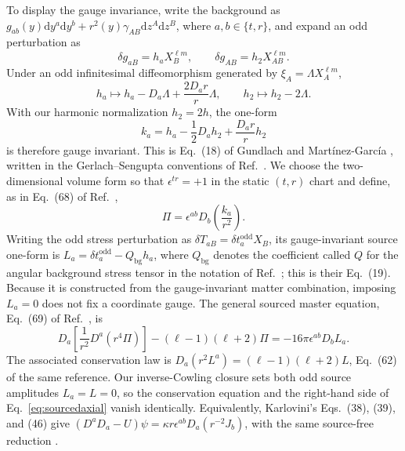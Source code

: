 \documentclass[12pt,a4paper]{article}
\newcommand{\dd}{\mathrm{d}}
\begin{document}
To display the gauge invariance, write the background as
\(g_{ab}(y)\dd y^a\dd y^b+r^2(y)\gamma_{AB}\dd z^A\dd z^B\), where
\(a,b\in\{t,r\}\), and expand an odd perturbation as
\begin{equation}
\delta g_{aB}=h_a X_B^{\ell m},
\qquad
\delta g_{AB}=h_2 X_{AB}^{\ell m}.
\label{eq:odddecomposition}
\end{equation}
Under an odd infinitesimal diffeomorphism generated by
\(\xi_A=\Lambda X_A^{\ell m}\),
\begin{equation}
h_a\mapsto h_a-D_a\Lambda+\frac{2D_a r}{r}\Lambda,
\qquad
h_2\mapsto h_2-2\Lambda.
\label{eq:oddgaugetransformation}
\end{equation}
With our harmonic normalization \(h_2=2h\), the one-form
\begin{equation}
k_a=h_a-\frac12 D_a h_2+\frac{D_a r}{r}h_2
\label{eq:oddgaugeinvariant}
\end{equation}
is therefore gauge invariant.  This is Eq.~(18) of
Gundlach and Mart\'inez-Garc\'ia \cite{Gundlach1999}, written in the
Gerlach--Sengupta conventions of Ref.~\cite{Gerlach1979}.  We choose the
two-dimensional volume form so that \(\epsilon^{tr}=+1\) in the static
\((t,r)\) chart and define, as in Eq.~(68) of Ref.~\cite{Gundlach1999},
\begin{equation}
\Pi=\epsilon^{ab}D_b\left(\frac{k_a}{r^2}\right).
\label{eq:axialpi}
\end{equation}
Writing the odd stress perturbation as
\(\delta T_{aB}=\delta t_a^{\mathrm{odd}}X_B\), its gauge-invariant source
one-form is \(L_a=\delta t_a^{\mathrm{odd}}-Q_{\mathrm{bg}}h_a\), where
\(Q_{\mathrm{bg}}\) denotes the coefficient called \(Q\) for the
angular background stress tensor in the notation of
Ref.~\cite{Gundlach1999}; this is their Eq.~(19).  Because it is constructed
from the gauge-invariant matter combination, imposing \(L_a=0\) does not
fix a coordinate gauge.  The general sourced master equation, Eq.~(69) of
Ref.~\cite{Gundlach1999}, is
\begin{equation}
D_a\left[\frac{1}{r^2}D^a(r^4\Pi)\right]
-(\ell-1)(\ell+2)\Pi
=-16\pi\epsilon^{ab}D_bL_a .
\label{eq:sourcedaxial}
\end{equation}
The associated conservation law is
\(D_a(r^2L^a)=(\ell-1)(\ell+2)L\), Eq.~(62) of the same reference.
Our inverse-Cowling closure sets both odd source amplitudes \(L_a=L=0\),
so the conservation equation and the right-hand side of
Eq.~\eqref{eq:sourcedaxial} vanish identically.  Equivalently, Karlovini's
Eqs.~(38), (39), and (46) give
\((D^aD_a-U)\psi=\kappa r\epsilon^{ab}D_a(r^{-2}J_b)\), with the
same source-free reduction \cite{Karlovini2002}.
\end{document}
